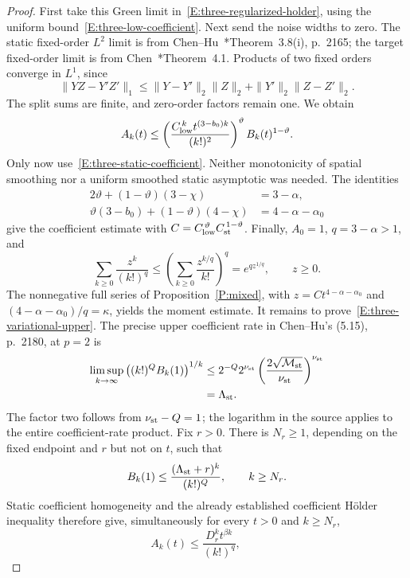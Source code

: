 \documentclass[12pt]{article}
\numberwithin{equation}{section}
\theoremstyle{definition}
\begin{document}
\begin{proof}
  First take this Green limit in~\eqref{E:three-regularized-holder},
  using the uniform bound~\eqref{E:three-low-coefficient}. Next send
  the noise widths to zero. The static fixed-order $L^2$ limit is from
  Chen--Hu~\cite{chen.hu:25:hyperbolic}*{Theorem~3.8(i), p.~2165};
  the target fixed-order limit is from
  Chen~\cite{chen:author2026:time-dependency}*{Theorem~4.1}.
  Products of two fixed orders converge in $L^1$, since
  \[
    \|YZ-Y'Z'\|_1
    \le\|Y-Y'\|_2\|Z\|_2+\|Y'\|_2\|Z-Z'\|_2.
  \]
  The split sums are finite, and zero-order factors remain one.
  We obtain
  \[
    A_k(t)\le
    \left(\frac{C_{\rm low}^{\,k}t^{(3-b_0)k}}{(k!)^2}\right)^\vartheta
    B_k(t)^{1-\vartheta}.
  \]
  Only now use~\eqref{E:three-static-coefficient}. Neither monotonicity
  of spatial smoothing nor a uniform smoothed static asymptotic was
  needed. The identities
  \[
    \begin{split}
      2\vartheta+(1-\vartheta)(3-\chi)&=3-\alpha,\\
      \vartheta(3-b_0)+(1-\vartheta)(4-\chi)&=4-\alpha-\alpha_0
    \end{split}
  \]
  give the coefficient estimate with
  $C=C_{\rm low}^{\,\vartheta}C_{\rm st}^{\,1-\vartheta}$.
  Finally, $A_0=1$, $q=3-\alpha>1$, and
  \[
    \sum_{k\ge0}\frac{z^k}{(k!)^q}
    \le\left(\sum_{k\ge0}\frac{z^{k/q}}{k!}\right)^q
    =e^{qz^{1/q}},\qquad z\ge0.
  \]
  The nonnegative full series of Proposition~\ref{P:mixed}, with
  $z=Ct^{4-\alpha-\alpha_0}$ and
  $(4-\alpha-\alpha_0)/q=\kappa$, yields the moment estimate.
  It remains to prove~\eqref{E:three-variational-upper}. The precise
  upper coefficient rate in Chen--Hu's (5.15), p.~2180, at $p=2$ is
  \[
    \begin{split}
      \limsup_{k\to\infty}
      \left((k!)^Q B_k(1)\right)^{1/k}
      &\le 2^{-Q}2^{\nu_{\rm st}}
      \left(\frac{2\sqrt{\mathcal{M}_{\rm st}}}{\nu_{\rm st}}\right)^{\nu_{\rm st}}\\
      &=\Lambda_{\rm st}.
    \end{split}
  \]
  The factor two follows from $\nu_{\rm st}-Q=1$; the logarithm in
  the source applies to the entire coefficient-rate product.
  Fix $r>0$. There is $N_r\ge1$, depending on the fixed endpoint
  and $r$ but not on $t$, such that
  \[
    B_k(1)\le\frac{(\Lambda_{\rm st}+r)^k}{(k!)^Q},
    \qquad k\ge N_r.
  \]
  Static coefficient homogeneity and the already established
  coefficient H\"older inequality therefore give, simultaneously for
  every $t>0$ and $k\ge N_r$,
  \[
    A_k(t)\le\frac{D_r^k t^{\beta k}}{(k!)^q},\qquad
\]
\end{proof}
\end{document}
